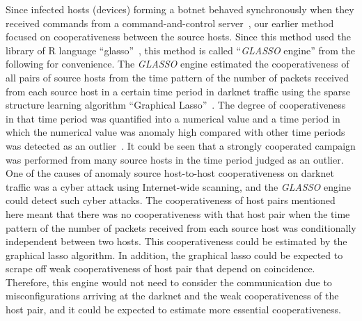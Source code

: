 \documentclass[conference]{IEEEtran}
\begin{document}
Since infected hosts (devices) forming a botnet behaved synchronously when they received commands from a command-and-control server~\cite{Akiyama}, our earlier method~\cite{Han} focused on cooperativeness between the source hosts.
Since this method used the library of R language ``glasso''~\cite{Friedman_glasso}, this method is called ``{\it GLASSO} engine'' from the following for convenience.
The {\it GLASSO} engine estimated the cooperativeness of all pairs of source hosts from the time pattern of the number of packets received from each source host in a certain time period in darknet traffic using the sparse structure learning algorithm ``Graphical Lasso''~\cite{Friedman,Ide}.
The degree of cooperativeness in that time period was quantified into a numerical value and a time period in which the numerical value was anomaly high compared with other time periods was detected as an outlier~\cite{Han}.
It could be seen that a strongly cooperated campaign was performed from many source hosts in the time period judged as an outlier.
One of the causes of anomaly source host-to-host cooperativeness on darknet traffic was a cyber attack using Internet-wide scanning, and the {\it GLASSO} engine could detect such cyber attacks.
The cooperativeness of host pairs mentioned here meant that there was no cooperativeness with that host pair when the time pattern of the number of packets received from each source host was conditionally independent between two hosts.
This cooperativeness could be estimated by the graphical lasso algorithm.
In addition, the graphical lasso could be expected to scrape off weak cooperativeness of host pair that depend on coincidence.
Therefore, this engine would not need to consider the communication due to misconfigurations arriving at the darknet and the weak cooperativeness of the host pair, and it could be expected to estimate more essential cooperativeness.
\end{document}
